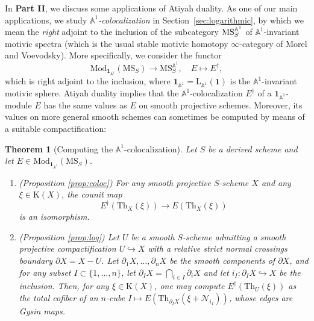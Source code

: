 \documentclass{amsart}
\numberwithin{equation}{section}
\theoremstyle{plain}
\newtheorem{theorem}[equation]{Theorem}
\theoremstyle{definition}
\let\scr=\mathcal
\let\bb=\mathbb
\def\A{\bb A}
\def\1{\mathbf 1}
\def\L{\mathrm{L}{}}
\let\into=\hookrightarrow
\def\Th{\mathrm{Th}}
\let\cat=\mathrm
\def\K{\mathrm{K}{}}
\def\Mod{\cat{M}\mathrm{od}{}}
\def\MS{\mathrm{MS}}
\begin{document}
In \textbf{Part II}, we discuss some applications of Atiyah duality. 
As one of our main applications, we study \emph{$\A^1$-colocalization} in Section~\ref{sec:logarithmic}, by which we mean the \emph{right} adjoint to the inclusion of the subcategory $\MS_S^{\smash[t]{\A^1}}$ of $\A^1$-invariant motivic spectra (which is the usual stable motivic homotopy $\infty$-category of Morel and Voevodsky).
More specifically, we consider the functor
\[
\Mod_{\1_{\A^1}}(\MS_S) \to \MS_S^{\A^1}, \quad E\mapsto E^\dagger,
\]
which is right adjoint to the inclusion, where $\1_{\A^1}=\L_{\A^1}(\1)$ is the $\A^1$-invariant motivic sphere.
Atiyah duality implies that the $\A^1$-colocalization $E^\dagger$ of a $\1_{\A^1}$-module $E$ has the same values as $E$ on smooth projective schemes. Moreover, its values on more general smooth schemes can sometimes be computed by means of a suitable compactification:

\begin{theorem}[Computing the $\A^1$-colocalization]
	\label{thm:intro-A1-coloc}
	Let $S$ be a derived scheme and let $E\in \Mod_{\1_{\A^1}}(\MS_S)$.
	\begin{enumerate}
		\item \textnormal{(Proposition \ref{prop:coloc})} For any smooth projective $S$-scheme $X$ and any $\xi\in \K(X)$, the counit map
		\[
		E^\dagger(\Th_X(\xi)) \to E(\Th_X(\xi))
		\]
		is an isomorphism.
		\item \textnormal{(Proposition \ref{prop:log})} Let $U$ be a smooth $S$-scheme admitting a smooth projective compactification $U\into X$ with a relative strict normal crossings boundary $\partial X=X- U$. Let $\partial_1X,\dotsc,\partial_nX$ be the smooth components of $\partial X$, and for any subset $I\subset \{1,\dotsc,n\}$, let $\partial_IX=\bigcap_{i\in I}\partial_iX$ and let $i_I\colon \partial_IX\into X$ be the inclusion.
		 Then, for any $\xi\in\K(X)$, one may compute $E^\dagger(\Th_U(\xi))$ as the total cofiber of an $n$-cube $I\mapsto E(\Th_{\partial_IX}(\xi+\scr N_{i_I}))$, whose edges are Gysin maps.
	\end{enumerate}
\end{theorem}
\end{document}
